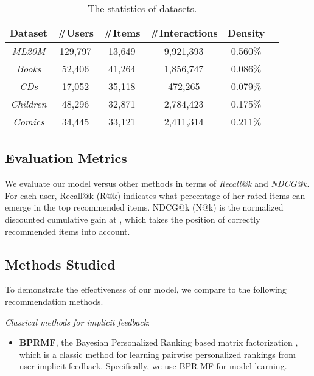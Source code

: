 \documentclass[sigconf]{acmart}
\begin{document}
\begin{table}[ht]
\centering
\caption{\label{tab:data_statistics}The statistics of datasets.}
\begin{tabular}{ |c|c|c|c|c|c| }
 \hline
 Dataset & \#Users & \#Items & \#Interactions & Density \\
 \hline
 \textit{ML20M} & 129,797 & 13,649 & 9,921,393 & 0.560\% \\ 
 \hline
 \textit{Books} & 52,406 & 41,264 & 1,856,747 & 0.086\% \\ 
 \hline
 \textit{CDs} & 17,052 & 35,118 & 472,265 & 0.079\% \\ 
 \hline
 \textit{Children} & 48,296 & 32,871 & 2,784,423 & 0.175\% \\ 
 \hline
 \textit{Comics} & 34,445 & 33,121 & 2,411,314 & 0.211\% \\ 
 \hline
\end{tabular}
\vspace{-0.3cm}
\end{table}

\subsection{Evaluation Metrics}
We evaluate our model versus other methods in terms of \textit{Recall@k} and \textit{NDCG@k}. For each user, Recall@k (R@k) indicates what percentage of her rated items can emerge in the top  recommended items. NDCG@k (N@k) is the normalized discounted cumulative gain at , which takes the position of correctly recommended items into account. 

\begin{comment}


where  is number of users,  is a set of top- unrated items recommended to user  excluding those items in the training, and  is a set of items that are rated by user  in the testing.  is the precision of a cut-off rank list from  to , and  is an indicator function that equals to  if the item is rated in the testing, otherwise equals to .

\end{comment}


\subsection{Methods Studied}
To demonstrate the effectiveness of our model, we compare to the following recommendation methods.

\textit{Classical methods for implicit feedback}:
\begin{itemize}
\item \textbf{BPRMF}, the Bayesian Personalized Ranking based matrix factorization \cite{DBLP:conf/uai/RendleFGS09}, which is a classic method for learning pairwise personalized rankings from user implicit feedback. Specifically, we use BPR-MF for model learning.
\end{itemize}
\end{document}
